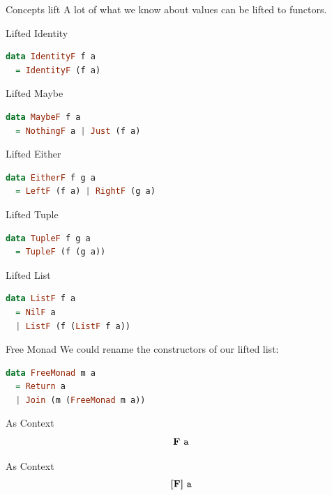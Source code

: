 \documentclass[utf8x,notes,17pt]{beamer}
\begin{document}
\begin{frame}[fragile,label=sec-13-24]{Concepts lift}
A lot of what we know about values can be lifted to functors.
\end{frame}
\begin{frame}[fragile,label=sec-13-25]{Lifted Identity}
\begin{lstlisting}[language=Haskell]
data IdentityF f a
  = IdentityF (f a)
\end{lstlisting}
\end{frame}
\begin{frame}[fragile,label=sec-13-26]{Lifted Maybe}
\begin{lstlisting}[language=Haskell]
data MaybeF f a
  = NothingF a | Just (f a)
\end{lstlisting}
\end{frame}
\begin{frame}[fragile,label=sec-13-27]{Lifted Either}
\begin{lstlisting}[language=Haskell]
data EitherF f g a
  = LeftF (f a) | RightF (g a)
\end{lstlisting}
\end{frame}
\begin{frame}[fragile,label=sec-13-28]{Lifted Tuple}
\begin{lstlisting}[language=Haskell]
data TupleF f g a
  = TupleF (f (g a))
\end{lstlisting}
\end{frame}
\begin{frame}[fragile,label=sec-13-29]{Lifted List}
\begin{lstlisting}[language=Haskell]
data ListF f a
  = NilF a
  | ListF (f (ListF f a))
\end{lstlisting}
\end{frame}
\begin{frame}[fragile,label=sec-13-30]{Free Monad}
We could rename the constructors of our lifted list:

\vspace{2ex}
\begin{lstlisting}[language=Haskell]
data FreeMonad m a
  = Return a
  | Join (m (FreeMonad m a))
\end{lstlisting}
\end{frame}
\begin{frame}[fragile,label=sec-13-31]{As Context}
\fontsize{42}{48}\selectfont
\[ \textbf{F}\ {\tt a} \]
\end{frame}
\begin{frame}[fragile,label=sec-13-32]{As Context}
\fontsize{32}{36}\selectfont
\[ \textbf{[F]}\ {\tt a} \]
\end{frame}
\end{document}
